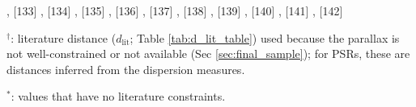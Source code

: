 \begin{table*}
\begin{adjustbox}{width=0.98\textwidth}
\begin{threeparttable}
\begin{tablenotes}
\cite{Pletsch15}, [133] \cite{Thompson19}, [134] \cite{Yuan22}, [135] \cite{Yi22}, [136] \cite{Mazeh22}, [137] \cite{El-Badry23b}, [138] \cite{Lin23}, [139] \cite{Jayasinghe19}, [140] \cite{El-Badry23a}, [141] \cite{Khokhlov18}, [142] \cite{Zheng22} 
          \item $^\dag$: literature distance ($d_\mathrm{lit}$; Table \ref{tab:d_lit_table}) used because the 
          parallax is not well-constrained or not available (Sec \ref{sec:final_sample}); for PSRs, these are distances inferred from the \citet{Yao17} dispersion measures.
          \item $^\ast$: values that have no literature constraints.
      \end{tablenotes}
  \end{threeparttable}
  \end{adjustbox}
\end{table*}